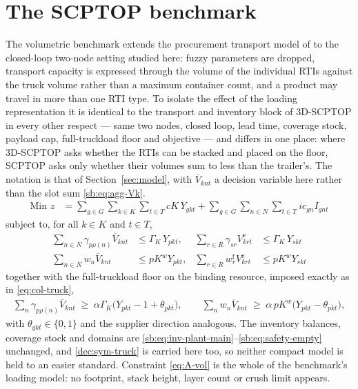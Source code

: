 \section{The SCPTOP benchmark}
\label{appendix:A}

The volumetric benchmark extends the procurement transport model of
\autocite{Diaz-Madronero2014APlanning} to the closed-loop two-node
setting studied here: fuzzy parameters are dropped, transport capacity
is expressed through the volume of the individual RTIs against the
truck volume rather than a maximum container count, and a product may
travel in more than one RTI type. To isolate the effect of the loading
representation it is identical to the transport and inventory block of
3D-SCPTOP in every other respect --- same two nodes, closed loop, lead
time, coverage stock, payload cap, full-truckload floor and objective
--- and differs in one place: where 3D-SCPTOP asks whether the RTIs can
be stacked and placed on the floor, SCPTOP asks only whether their
volumes sum to less than the trailer's. The notation is that of
Section~\ref{sec:model}, with $\overline{V}_{knt}$ a decision variable
here rather than the slot sum \eqref{sb:eq:agg-Vk}.
\begin{align}
\text{Min } z
&= \sum_{g\in G}\sum_{k\in K}\sum_{t\in T} cK\,Y_{gkt}
 + \sum_{g\in G}\sum_{n\in N}\sum_{t\in T} ic_{gn}I_{gnt}
 \label{eq:A-obj}
\end{align}
subject to, for all $k\in K$ and $t\in T$,
\begin{align}
\sum_{n\in N}\gamma_{p\rho(n)}\overline{V}_{knt} &\le \Gamma_{K}\,Y_{pkt},
 & \sum_{r\in R}\gamma_{sr}V^{\mathrm{e}}_{krt} &\le \Gamma_{K}\,Y_{skt}
 \label{eq:A-vol}\\
\sum_{n\in N}w_{n}\overline{V}_{knt} &\le pK^{w}Y_{pkt},
 & \sum_{r\in R}w^{\mathrm{f}}_{r}V^{\mathrm{e}}_{krt} &\le pK^{w}Y_{skt}
 \label{eq:A-weight}
\end{align}
together with the full-truckload floor on the binding resource, imposed
exactly as in \eqref{eq:col-truck},
\begin{align}
\sum_{n}\gamma_{p\rho(n)}\overline{V}_{knt} \;\ge\; \alpha\Gamma_{K}\bigl(Y_{pkt}-1+\theta_{pkt}\bigr),
\qquad
\sum_{n}w_{n}\overline{V}_{knt} \;\ge\; \alpha\,pK^{w}\bigl(Y_{pkt}-\theta_{pkt}\bigr),
\label{eq:A-ftl}
\end{align}
with $\theta_{gkt}\in\{0,1\}$ and the supplier direction analogous. The
inventory balances, coverage stock and domains are
\eqref{sb:eq:inv-plant-main}--\eqref{sb:eq:safety-empty} unchanged, and
\eqref{dec:sym-truck} is carried here too, so neither compact model is
held to an easier standard. Constraint \eqref{eq:A-vol} is the whole of
the benchmark's loading model: no footprint, stack height, layer count
or crush limit appears.